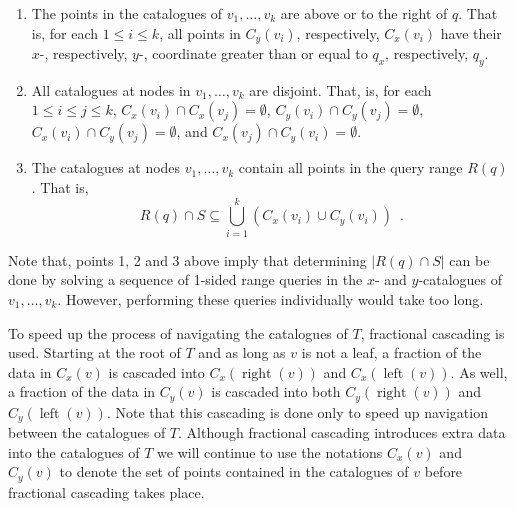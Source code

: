 \documentclass[charterfonts]{patmorin}
\DeclareMathOperator{\lft}{left}
\DeclareMathOperator{\rght}{right}
\begin{document}
\begin{enumerate}

\item The points in the catalogues of $v_1,\ldots,v_k$ are above or to
the right of $q$.  That is, for each $1\le i \le k$, all points in
$C_y(v_i)$, respectively, $C_x(v_i)$ have their $x$-, respectively,
$y$-, coordinate greater than or equal to $q_x$, respectively, $q_y$.

\item All catalogues at nodes in $v_1,\ldots,v_k$ are disjoint.  That,
is, for each $1\le i\le j \le k$,
$C_x(v_i)\cap C_x(v_j) = \emptyset$,
$C_y(v_i)\cap C_y(v_j) = \emptyset$,
$C_x(v_i)\cap C_y(v_j) = \emptyset$, and
$C_x(v_j)\cap C_y(v_i) = \emptyset$.

\item The catalogues at nodes $v_1,\ldots,v_k$ contain all points in
the query range $R(q)$.  That is,
\[
     R(q)\cap S \subseteq \bigcup_{i=1}^k \left(C_x(v_i)\cup C_y(v_i)\right)
        \enspace . 
\]
\end{enumerate}

Note that, points 1, 2 and 3 above imply that determining $|R(q)\cap
S|$ can be done by solving a sequence of 1-sided range queries in the
$x$- and $y$-catalogues of $v_1,\ldots,v_k$.  However, performing these queries
individually would take too long.

To speed up the process of navigating the catalogues of $T$,
fractional cascading \cite{ae76} is used.  Starting at the root of $T$ and as long as $v$ is
not a leaf, a fraction of the data in $C_x(v)$ is cascaded into
$C_x(\rght(v))$ and $C_x(\lft(v))$.  As well, a fraction of the data
in $C_y(v)$ is cascaded into both $C_y(\rght(v))$ and $C_y(\lft(v))$.
%
%
%
%
%
Note that this
cascading is done only to speed up navigation between the catalogues
of $T$.  Although fractional cascading introduces extra data into the
catalogues of $T$ we will continue to use the notations $C_x(v)$ and
$C_y(v)$ to denote the set of points contained in the catalogues of
$v$ before fractional cascading takes place.
\end{document}
